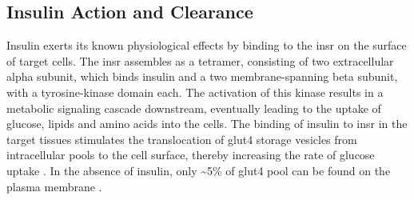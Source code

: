 


\subsection{Insulin Action and Clearance} %
\label{sec:insact}
Insulin exerts its known physiological effects by binding to the \gls{insr} on the surface of target cells. The \gls{insr} assembles as a tetramer, consisting of two extracellular alpha subunit, which binds insulin and a two membrane-spanning beta subunit, with a tyrosine-kinase domain each. The activation of this kinase results in a metabolic signaling cascade downstream, eventually leading to the uptake of glucose, lipids and amino acids into the cells. 
The binding of insulin to \gls{insr} in the target tissues stimulates the translocation of \gls{glut}4 storage vesicles from intracellular pools to the cell surface, thereby increasing the rate of glucose uptake \textbf{\cite{shepherd_glucose_1999,saltiel_insulin_2001,leto_regulation_2012}}. In the absence of insulin, only \textasciitilde5\% of \gls{glut}4 pool can be found on the plasma membrane \textbf{\cite{leto_regulation_2012}}.\\

